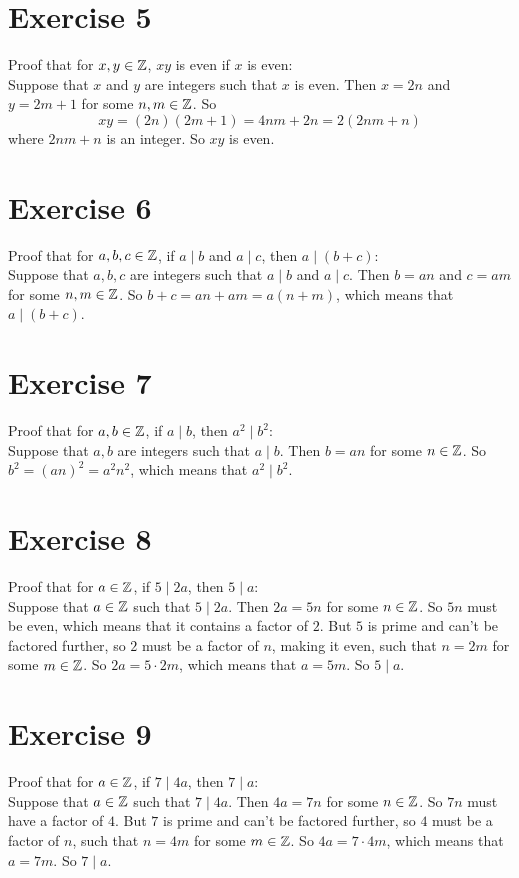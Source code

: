 \documentclass[12pt]{article}
\begin{document}
    \section*{Exercise 5}
    Proof that for $x, y \in \mathbb{Z}$,
    $xy$ is even if $x$ is even: \\
    Suppose that $x$ and $y$ are integers
    such that $x$ is even. 
    Then $x = 2n$ and $y = 2m+1$ for some $n, m \in \mathbb{Z}$.
    So 
    \[ xy = (2n)(2m+1) = 4nm + 2n = 2(2nm + n)\]
    where $2nm + n$ is an integer.
    So $xy$ is even. \\

    \section*{Exercise 6}
    Proof that for $a, b, c \in \mathbb{Z}$,
    if $a \mid b$ and $a \mid c$,
    then $a \mid (b+c)$: \\
    Suppose that $a, b, c$ are integers
    such that $a \mid b$ and $a \mid c$.
    Then $b = an$ and $c = am$ for some $n, m \in \mathbb{Z}$.
    So $b+c = an + am = a(n + m)$,
    which means that $a \mid (b+c)$. \\

    \section*{Exercise 7}
    Proof that for $a, b \in \mathbb{Z}$,
    if $a \mid b$,
    then $a^2 \mid b^2$: \\
    Suppose that $a, b$ are integers
    such that $a \mid b$.
    Then $b = an$ for some $n \in \mathbb{Z}$.
    So $b^2 = (an)^2 = a^2n^2$,
    which means that $a^2 \mid b^2$. \\

    \section*{Exercise 8}
    Proof that for $a \in \mathbb{Z}$,
    if $5 \mid 2a$,
    then $5 \mid a$: \\
    Suppose that $a \in \mathbb{Z}$
    such that $5 \mid 2a$.
    Then $2a = 5n$ for some $n \in \mathbb{Z}$.
    So $5n$ must be even,
    which means that it contains a factor of $2$.
    But $5$ is prime and can't be factored further,
    so $2$ must be a factor of $n$, making it even,
    such that $n = 2m$ for some $m \in \mathbb{Z}$.
    So $2a = 5 \cdot 2m$,
    which means that $a = 5m$.
    So $5 \mid a$. \\

    \section*{Exercise 9}
    Proof that for $a \in \mathbb{Z}$,
    if $7 \mid 4a$,
    then $7 \mid a$: \\
    Suppose that $a \in \mathbb{Z}$
    such that $7 \mid 4a$.
    Then $4a = 7n$ for some $n \in \mathbb{Z}$.
    So $7n$ must have a factor of $4$.
    But $7$ is prime and can't be factored further,
    so $4$ must be a factor of $n$,
    such that $n = 4m$ for some $m \in \mathbb{Z}$.
    So $4a = 7 \cdot 4m$,
    which means that $a = 7m$.
    So $7 \mid a$. \\
\end{document}
